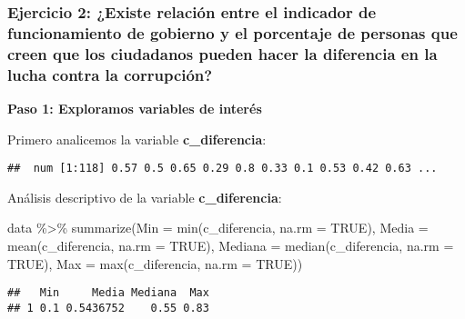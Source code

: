 \documentclass[
]{article}
\newenvironment{Shaded}{\begin{snugshade}}{\end{snugshade}}
\newcommand{\AttributeTok}[1]{\textcolor[rgb]{0.77,0.63,0.00}{#1}}
\newcommand{\ConstantTok}[1]{\textcolor[rgb]{0.00,0.00,0.00}{#1}}
\newcommand{\FunctionTok}[1]{\textcolor[rgb]{0.00,0.00,0.00}{#1}}
\newcommand{\NormalTok}[1]{#1}
\newcommand{\SpecialCharTok}[1]{\textcolor[rgb]{0.00,0.00,0.00}{#1}}
\begin{document}
\hypertarget{ejercicio-2-existe-relaciuxf3n-entre-el-indicador-de-funcionamiento-de-gobierno-y-el-porcentaje-de-personas-que-creen-que-los-ciudadanos-pueden-hacer-la-diferencia-en-la-lucha-contra-la-corrupciuxf3n}{%
\subsubsection{Ejercicio 2: ¿Existe relación entre el indicador de
funcionamiento de gobierno y el porcentaje de personas que creen que los
ciudadanos pueden hacer la diferencia en la lucha contra la
corrupción?}\label{ejercicio-2-existe-relaciuxf3n-entre-el-indicador-de-funcionamiento-de-gobierno-y-el-porcentaje-de-personas-que-creen-que-los-ciudadanos-pueden-hacer-la-diferencia-en-la-lucha-contra-la-corrupciuxf3n}}

\textbf{Paso 1: Exploramos variables de interés}

Primero analicemos la variable \textbf{c\_diferencia}:

\begin{Shaded}
\end{Shaded}

\begin{verbatim}
##  num [1:118] 0.57 0.5 0.65 0.29 0.8 0.33 0.1 0.53 0.42 0.63 ...
\end{verbatim}

Análisis descriptivo de la variable \textbf{c\_diferencia}:

\begin{Shaded}
\begin{Highlighting}[]
\NormalTok{data }\SpecialCharTok{\%\textgreater{}\%}
 \FunctionTok{summarize}\NormalTok{(}\AttributeTok{Min =} \FunctionTok{min}\NormalTok{(c\_diferencia, }\AttributeTok{na.rm =} \ConstantTok{TRUE}\NormalTok{),}
           \AttributeTok{Media =} \FunctionTok{mean}\NormalTok{(c\_diferencia, }\AttributeTok{na.rm =} \ConstantTok{TRUE}\NormalTok{),}
           \AttributeTok{Mediana =} \FunctionTok{median}\NormalTok{(c\_diferencia, }\AttributeTok{na.rm =} \ConstantTok{TRUE}\NormalTok{),}
           \AttributeTok{Max =} \FunctionTok{max}\NormalTok{(c\_diferencia, }\AttributeTok{na.rm =} \ConstantTok{TRUE}\NormalTok{))}
\end{Highlighting}
\end{Shaded}

\begin{verbatim}
##   Min     Media Mediana  Max
## 1 0.1 0.5436752    0.55 0.83
\end{verbatim}
\end{document}
